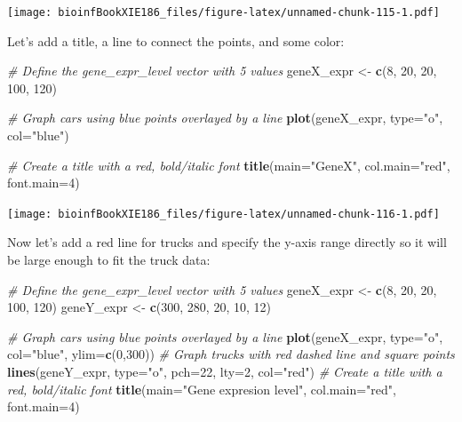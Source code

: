 \documentclass[]{book}
\makeatletter
\newenvironment{Shaded}{\begin{snugshade}}{\end{snugshade}}
\newcommand{\CommentTok}[1]{\textcolor[rgb]{0.56,0.35,0.01}{\textit{#1}}}
\newcommand{\DataTypeTok}[1]{\textcolor[rgb]{0.13,0.29,0.53}{#1}}
\newcommand{\DecValTok}[1]{\textcolor[rgb]{0.00,0.00,0.81}{#1}}
\newcommand{\KeywordTok}[1]{\textcolor[rgb]{0.13,0.29,0.53}{\textbf{#1}}}
\newcommand{\NormalTok}[1]{#1}
\newcommand{\StringTok}[1]{\textcolor[rgb]{0.31,0.60,0.02}{#1}}
\newenvironment{kframe}{%
\medskip{}
\setlength{\fboxsep}{.8em}
 \def\at@end@of@kframe{}%
 \ifinner\ifhmode%
  \def\at@end@of@kframe{\end{minipage}}%
  \begin{minipage}{\columnwidth}%
 \fi\fi%
 \def\FrameCommand##1{\hskip\@totalleftmargin \hskip-\fboxsep
 \colorbox{shadecolor}{##1}\hskip-\fboxsep
     \hskip-\linewidth \hskip-\@totalleftmargin \hskip\columnwidth}%
 \MakeFramed {\advance\hsize-\width
   \@totalleftmargin\z@ \linewidth\hsize
   \@setminipage}}%
 {\par\unskip\endMakeFramed%
 \at@end@of@kframe}
\renewenvironment{Shaded}{\begin{kframe}}{\end{kframe}}
\makeatother
\begin{document}
\texttt{[image: bioinfBookXIE186\_files/figure-latex/unnamed-chunk-115-1.pdf]}

Let's add a title, a line to connect the points, and some color:

\begin{Shaded}
\begin{Highlighting}[]
\CommentTok{# Define the gene_expr_level vector with 5 values}
\NormalTok{geneX_expr <-}\StringTok{ }\KeywordTok{c}\NormalTok{(}\DecValTok{8}\NormalTok{, }\DecValTok{20}\NormalTok{, }\DecValTok{20}\NormalTok{, }\DecValTok{100}\NormalTok{, }\DecValTok{120}\NormalTok{)}

\CommentTok{# Graph cars using blue points overlayed by a line }
\KeywordTok{plot}\NormalTok{(geneX_expr, }\DataTypeTok{type=}\StringTok{"o"}\NormalTok{, }\DataTypeTok{col=}\StringTok{"blue"}\NormalTok{)}

\CommentTok{# Create a title with a red, bold/italic font}
\KeywordTok{title}\NormalTok{(}\DataTypeTok{main=}\StringTok{"GeneX"}\NormalTok{, }\DataTypeTok{col.main=}\StringTok{"red"}\NormalTok{, }\DataTypeTok{font.main=}\DecValTok{4}\NormalTok{)}
\end{Highlighting}
\end{Shaded}

\texttt{[image: bioinfBookXIE186\_files/figure-latex/unnamed-chunk-116-1.pdf]}

Now let's add a red line for trucks and specify the y-axis range directly so it will be large enough to fit the truck data:

\begin{Shaded}
\begin{Highlighting}[]
\CommentTok{# Define the gene_expr_level vector with 5 values}
\NormalTok{geneX_expr <-}\StringTok{ }\KeywordTok{c}\NormalTok{(}\DecValTok{8}\NormalTok{, }\DecValTok{20}\NormalTok{, }\DecValTok{20}\NormalTok{, }\DecValTok{100}\NormalTok{, }\DecValTok{120}\NormalTok{)}
\NormalTok{geneY_expr <-}\StringTok{ }\KeywordTok{c}\NormalTok{(}\DecValTok{300}\NormalTok{, }\DecValTok{280}\NormalTok{, }\DecValTok{20}\NormalTok{, }\DecValTok{10}\NormalTok{, }\DecValTok{12}\NormalTok{)}

\CommentTok{# Graph cars using blue points overlayed by a line }
\KeywordTok{plot}\NormalTok{(geneX_expr, }\DataTypeTok{type=}\StringTok{"o"}\NormalTok{, }\DataTypeTok{col=}\StringTok{"blue"}\NormalTok{, }\DataTypeTok{ylim=}\KeywordTok{c}\NormalTok{(}\DecValTok{0}\NormalTok{,}\DecValTok{300}\NormalTok{))}
\CommentTok{# Graph trucks with red dashed line and square points}
\KeywordTok{lines}\NormalTok{(geneY_expr, }\DataTypeTok{type=}\StringTok{"o"}\NormalTok{, }\DataTypeTok{pch=}\DecValTok{22}\NormalTok{, }\DataTypeTok{lty=}\DecValTok{2}\NormalTok{, }\DataTypeTok{col=}\StringTok{"red"}\NormalTok{)}
\CommentTok{# Create a title with a red, bold/italic font}
\KeywordTok{title}\NormalTok{(}\DataTypeTok{main=}\StringTok{"Gene expresion level"}\NormalTok{, }\DataTypeTok{col.main=}\StringTok{"red"}\NormalTok{, }\DataTypeTok{font.main=}\DecValTok{4}\NormalTok{)}
\end{Highlighting}
\end{Shaded}
\end{document}
